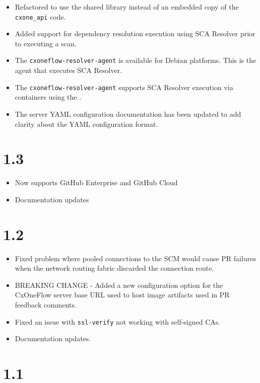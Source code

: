 \begin{itemize}
    \item Refactored to use the shared library \space instead
    of an embedded copy of the \texttt{cxone\_api} code.
    \item Added support for dependency resolution execution using SCA Resolver prior to executing a scan.
    \item The \texttt{cxoneflow-resolver-agent} is available for Debian platforms.  This is the agent that executes SCA Resolver.
    \item The \texttt{cxoneflow-resolver-agent} supports SCA Resolver execution via containers using the \toolkit.
    \item The server YAML configuration documentation has been updated to add clarity about the YAML configuration format.
\end{itemize}


\section{1.3}

\begin{itemize}
    \item Now supports GitHub Enterprise and GitHub Cloud
    \item Documentation updates
\end{itemize}

\section{1.2}

\begin{itemize}
    \item Fixed problem where pooled connections to the SCM would cause PR failures when the network routing 
    fabric discarded the connection route.
    \item BREAKING CHANGE - Added a new configuration option for the CxOneFlow server base URL used to host image
    artifacts used in PR feedback comments.
    \item Fixed an issue with \texttt{ssl-verify} not working with self-signed CAs.
    \item Documentation updates.
\end{itemize}


\section{1.1}

